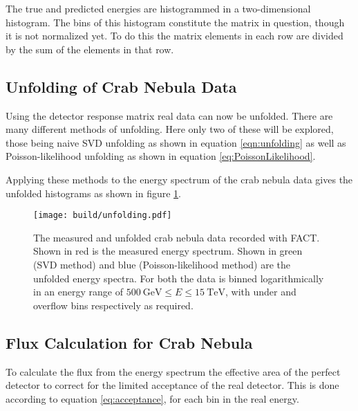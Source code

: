             The true and predicted energies are histogrammed in a two-dimensional histogram.
            The bins of this histogram constitute the matrix in question, though it is not normalized yet.
            To do this the matrix elements in each row are divided by the sum of the elements in that row.
        \subsection{Unfolding of Crab Nebula Data}
            Using the detector response matrix real data can now be unfolded.
            There are many different methods of unfolding.
            Here only two of these will be explored, those being naive SVD unfolding as shown in equation \eqref{eqn:unfolding} as well as Poisson-likelihood unfolding as shown in equation \eqref{eq:PoissonLikelihood}.

            Applying these methods to the energy spectrum of the crab nebula data gives the unfolded histograms as shown in figure \ref{fig:unfolding}.
            \begin{figure}
                \centering
                \texttt{[image: build/unfolding.pdf]}
                \caption{
                    The measured and unfolded crab nebula data recorded with FACT.
                    Shown in red is the measured energy spectrum.
                    Shown in green (SVD method) and blue (Poisson-likelihood method) are the unfolded energy spectra.
                    For both the data is binned logarithmically in an energy range of $\SI{500}{\giga\electronvolt} \leq E \leq \SI{15}{\tera\electronvolt}$, with under and overflow bins respectively as required.
                }
                \label{fig:unfolding}
            \end{figure}

        \subsection{Flux Calculation for Crab Nebula}
            To calculate the flux from the energy spectrum the effective area of the perfect detector to correct for the limited acceptance of the real detector.
            This is done according to equation \eqref{eq:acceptance}, for each bin in the real energy.

